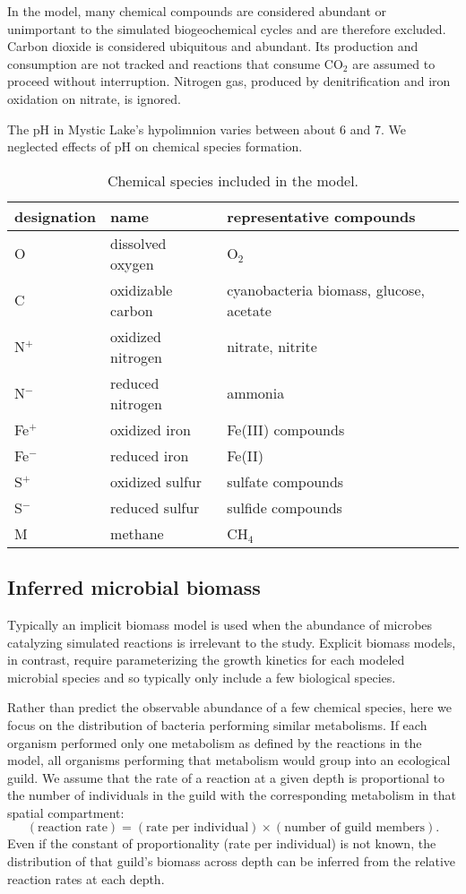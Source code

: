 \documentclass{report}
\begin{document}
In the model, many chemical compounds are considered abundant or unimportant to the simulated biogeochemical cycles and are therefore excluded. Carbon dioxide is considered ubiquitous and abundant. Its production and consumption are not tracked and reactions that consume
CO$_2$ are assumed to proceed without interruption. Nitrogen gas, produced by denitrification
and iron oxidation on nitrate, is ignored.

The pH in Mystic Lake's hypolimnion varies between about 6 and 7. We neglected effects of pH on chemical species formation.

\begin{table}
\centering
\begin{tabular}{ l l l }
\toprule
designation & name  & representative compounds \\
\midrule
O   & dissolved oxygen    & O$_2$ \\
C   & oxidizable carbon & cyanobacteria biomass, glucose, acetate \\
N$^+$ & oxidized nitrogen &  nitrate, nitrite \\
N$^-$ & reduced nitrogen  & ammonia \\
Fe$^+$ &  oxidized iron  & Fe(III) compounds  \\
Fe$^-$ &  reduced iron  & Fe(II)  \\
S$^+$ &  oxidized sulfur  & sulfate compounds \\
S$^-$ &  reduced sulfur  & sulfide compounds  \\
M   &   methane &   CH$_4$ \\
\bottomrule
\end{tabular}
\caption{Chemical species included in the model.}
\label{tab:chemical_species}
\end{table}

\subsection{Inferred microbial biomass}
Typically an implicit biomass model is used when the abundance of microbes catalyzing
simulated reactions is irrelevant to the study. Explicit biomass models, in contrast, require parameterizing the growth kinetics for each modeled microbial species and so typically only include a few biological species. 

Rather than predict the observable abundance of a few chemical species, here we focus on the
distribution of bacteria performing similar metabolisms. If each organism performed only
one metabolism as defined by the reactions in the model, all organisms performing that
metabolism would group into an ecological guild. We assume that the
rate of a reaction at a given depth is proportional to the number of individuals in the guild with the
corresponding metabolism in that spatial compartment:
\begin{equation}
  (\text{reaction rate}) = (\text{rate per individual}) \times (\text{number of guild members}).
\end{equation}
Even if the constant of proportionality (rate per individual) is not known, the distribution of
that guild's biomass across
depth can be inferred from the relative reaction rates at each depth.
\end{document}
